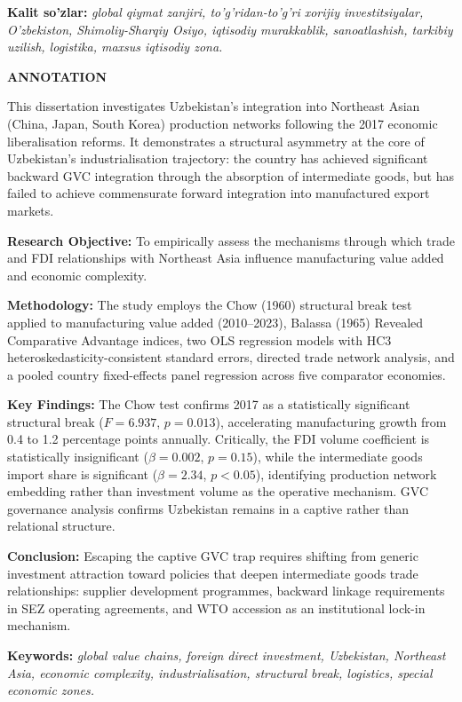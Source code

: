 \vspace{0.8em}
\noindent\textbf{Kalit so'zlar:} \textit{global qiymat zanjiri, to'g'ridan-to'g'ri xorijiy investitsiyalar, O'zbekiston, Shimoliy-Sharqiy Osiyo, iqtisodiy murakkablik, sanoatlashish, tarkibiy uzilish, logistika, maxsus iqtisodiy zona.}

\newpage
\thispagestyle{plain}
\begin{center}
 {\large\bfseries ANNOTATION}
\end{center}

\vspace{0.5em}
\noindent
This dissertation investigates Uzbekistan's integration into Northeast Asian (China, Japan, South Korea) production networks following the 2017 economic liberalisation reforms. It demonstrates a structural asymmetry at the core of Uzbekistan's industrialisation trajectory: the country has achieved significant backward GVC integration through the absorption of intermediate goods, but has failed to achieve commensurate forward integration into manufactured export markets.

\textbf{Research Objective:} To empirically assess the mechanisms through which trade and FDI relationships with Northeast Asia influence manufacturing value added and economic complexity.

\textbf{Methodology:} The study employs the Chow (1960) structural break test applied to manufacturing value added (2010--2023), Balassa (1965) Revealed Comparative Advantage indices, two OLS regression models with HC3 heteroskedasticity-consistent standard errors, directed trade network analysis, and a pooled country fixed-effects panel regression across five comparator economies.

\textbf{Key Findings:} The Chow test confirms 2017 as a statistically significant structural break ($F=6.937$, $p=0.013$), accelerating manufacturing growth from 0.4 to 1.2 percentage points annually. Critically, the FDI volume coefficient is statistically insignificant ($\beta=0.002$, $p=0.15$), while the intermediate goods import share is significant ($\beta=2.34$, $p<0.05$), identifying production network embedding rather than investment volume as the operative mechanism. GVC governance analysis confirms Uzbekistan remains in a captive rather than relational structure.

\textbf{Conclusion:} Escaping the captive GVC trap requires shifting from generic investment attraction toward policies that deepen intermediate goods trade relationships: supplier development programmes, backward linkage requirements in SEZ operating agreements, and WTO accession as an institutional lock-in mechanism.

\vspace{0.8em}
\noindent\textbf{Keywords:} \textit{global value chains, foreign direct investment, Uzbekistan, Northeast Asia, economic complexity, industrialisation, structural break, logistics, special economic zones.}

